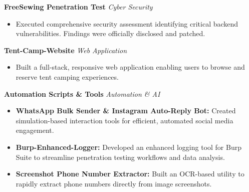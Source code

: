 \documentclass[11pt,a4paper]{article}
\begin{document}
\textbf{FreeSewing Penetration Test} \hfill \textit{Cyber Security}
\begin{itemize}[leftmargin=0.25in]
    \item Executed comprehensive security assessment identifying critical backend vulnerabilities. Findings were officially disclosed and patched.
\end{itemize}

\textbf{Tent-Camp-Website} \hfill \textit{Web Application}
\begin{itemize}[leftmargin=0.25in]
    \item Built a full-stack, responsive web application enabling users to browse and reserve tent camping experiences.
\end{itemize}

\textbf{Automation Scripts \& Tools} \hfill \textit{Automation \& AI}
\begin{itemize}[leftmargin=0.25in]
    \item \textbf{WhatsApp Bulk Sender \& Instagram Auto-Reply Bot:} Created simulation-based interaction tools for efficient, automated social media engagement.
    \item \textbf{Burp-Enhanced-Logger:} Developed an enhanced logging tool for Burp Suite to streamline penetration testing workflows and data analysis.
    \item \textbf{Screenshot Phone Number Extractor:} Built an OCR-based utility to rapidly extract phone numbers directly from image screenshots.
\end{itemize}
\end{document}
